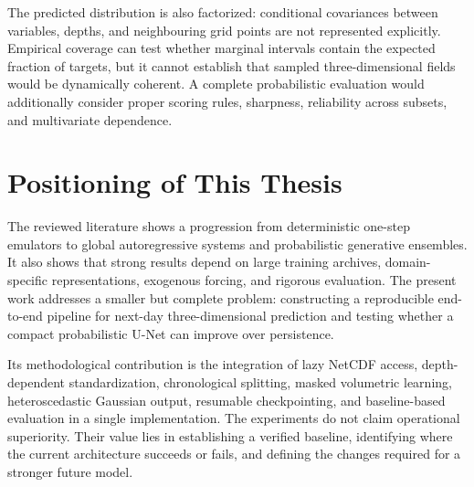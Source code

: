 The predicted distribution is also factorized: conditional covariances between variables, depths, and neighbouring grid points are not represented explicitly. Empirical coverage can test whether marginal intervals contain the expected fraction of targets, but it cannot establish that sampled three-dimensional fields would be dynamically coherent. A complete probabilistic evaluation would additionally consider proper scoring rules, sharpness, reliability across subsets, and multivariate dependence.

\section{Positioning of This Thesis}

The reviewed literature shows a progression from deterministic one-step emulators to global autoregressive systems and probabilistic generative ensembles. It also shows that strong results depend on large training archives, domain-specific representations, exogenous forcing, and rigorous evaluation. The present work addresses a smaller but complete problem: constructing a reproducible end-to-end pipeline for next-day three-dimensional prediction and testing whether a compact probabilistic U-Net can improve over persistence.

Its methodological contribution is the integration of lazy NetCDF access, depth-dependent standardization, chronological splitting, masked volumetric learning, heteroscedastic Gaussian output, resumable checkpointing, and baseline-based evaluation in a single implementation. The experiments do not claim operational superiority. Their value lies in establishing a verified baseline, identifying where the current architecture succeeds or fails, and defining the changes required for a stronger future model.
